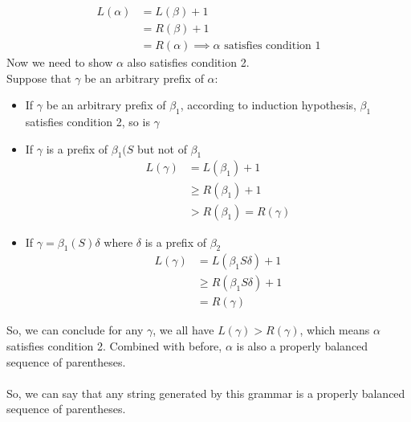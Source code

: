 \documentclass [9 pt]{article}
\theoremstyle{definition}
\begin{document}
\begin{align*}
	L(\alpha) 
	&= L(\beta) + 1\\
	&= R(\beta) + 1\\
	&= R(\alpha) \implies \text{$\alpha$ satisfies condition 1}
\end{align*}
Now we need to show $\alpha$ also satisfies condition 2.\\
Suppose that $\gamma$ be an arbitrary prefix of $\alpha$:
\begin{itemize}
	\item If  $\gamma$ be an arbitrary prefix of $\beta_1$, according to induction hypothesis, $\beta_1$ satisfies condition 2, so is $\gamma$
	\item If $\gamma$ is a prefix of $\beta_1( S$ but not of $\beta_1$
	\begin{align*}
		L(\gamma) 
		&= L(\beta_1) + 1\\
		&\geq R(\beta_1) + 1\\
		&> R(\beta_1) = R(\gamma ) 
	\end{align*}
	\item If $\gamma = \beta_1( S ) \delta$ where $\delta $ is a prefix of $\beta_2$
	\begin{align*}
		L(\gamma) 
		&= L(\beta_1 S  \delta) + 1\\
		&\geq R(\beta_1 S  \delta) + 1\\
		&= R(\gamma ) 
	\end{align*}
	
\end{itemize}
So, we can conclude for any $\gamma$, we all have $L(\gamma) > R(\gamma)$, which means $\alpha $ satisfies condition 2. Combined with before, $\alpha $ is also a properly balanced sequence of parentheses.\\\\
So, we can say that any string generated by this grammar is a properly balanced sequence of parentheses.















\newpage
\end{document}
